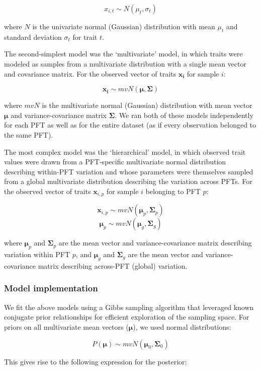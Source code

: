 \[x_{i,t} \sim N(\mu_t, \sigma_t)\]

where $N$ is the univariate normal (Gaussian) distribution with mean $\mu_t$ and standard deviation $\sigma_t$ for trait $t$.

The second-simplest model was the ‘multivariate’ model, in which traits were modeled as samples from a multivariate distribution with a single mean vector and covariance matrix.
For the observed vector of traits ${\mathbf{x_i}}$ for sample $i$:

\[\mathbf{x_i} \sim mvN(\mathbf{\mu}, \mathbf{\Sigma})\]

where $mvN$ is the multivariate normal (Gaussian) distribution with mean vector $\mathbf{\mu}$ and variance-covariance matrix $\mathbf{\Sigma}$.
We ran both of these models independently for each PFT as well as for the entire dataset (as if every observation belonged to the same PFT).

The most complex model was the ‘hierarchical’ model, in which observed trait values were drawn from a PFT-specific multivariate normal distribution describing within-PFT variation and whose parameters were themselves sampled from a global multivariate distribution describing the variation across PFTs.
For the observed vector of traits $\mathbf{x}_{i,p}$ for sample $i$ belonging to PFT $p$:

\[\mathbf{x}_{i,p} \sim mvN(\mathbf{\mu}_p, \mathbf{\Sigma}_p)\]
\[\mathbf{\mu}_p \sim mvN(\mathbf{\mu}_g, \mathbf{\Sigma}_g)\]

where $\mathbf{\mu}_p$ and $\mathbf{\Sigma}_p$ are the mean vector and variance-covariance matrix describing variation within PFT $p$, and $\mathbf{\mu}_g$ and $\mathbf{\Sigma}_g$ are the mean vector and variance-covariance matrix describing across-PFT (global) variation.


\subsubsection{Model implementation}

We fit the above models using a Gibbs sampling algorithm that leveraged known conjugate prior relationships for efficient exploration of the sampling space.
For priors on all multivariate mean vectors ($\mathbf{\mu}$), we used normal distributions:

\[P(\mathbf{\mu}) \sim mvN(\mathbf{\mu}_0, {\mathbf{\Sigma}}_0)\]

This gives rise to the following expression for the posterior:

